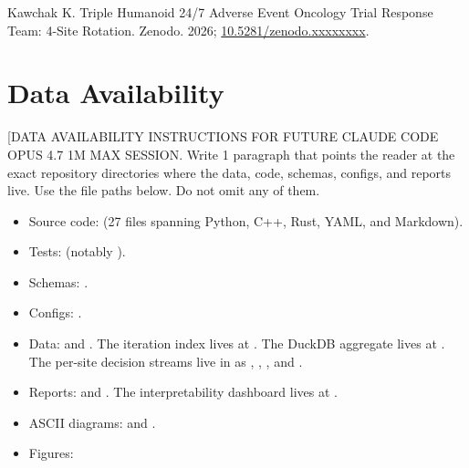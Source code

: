 Kawchak K. Triple Humanoid 24/7 Adverse Event Oncology Trial Response
Team: 4-Site Rotation. Zenodo. 2026; \href{https://doi.org/10.5281/zenodo.xxxxxxxx}{10.5281/zenodo.xxxxxxxx}.

{}
\section*{Data Availability}

[DATA AVAILABILITY INSTRUCTIONS FOR FUTURE CLAUDE CODE OPUS 4.7 1M
MAX SESSION. Write 1 paragraph that points the reader at the exact
repository directories where the data, code, schemas, configs, and
reports live. Use the file paths below. Do not omit any of them.

\begin{itemize}
  \item Source code: 
        (27 files spanning Python, C++, Rust, YAML, and Markdown).
  \item Tests: 
        (notably ).
  \item Schemas: .
  \item Configs: .
  \item Data: 
        and .
        The iteration index lives at
        . The DuckDB
        aggregate lives at
        . The
        per-site decision streams live in
         as
        ,
        ,
        , and
        .
  \item Reports: 
        and .
        The interpretability dashboard lives at
        .
  \item ASCII diagrams:
        and
        .
  \item Figures: 

\end{itemize}
